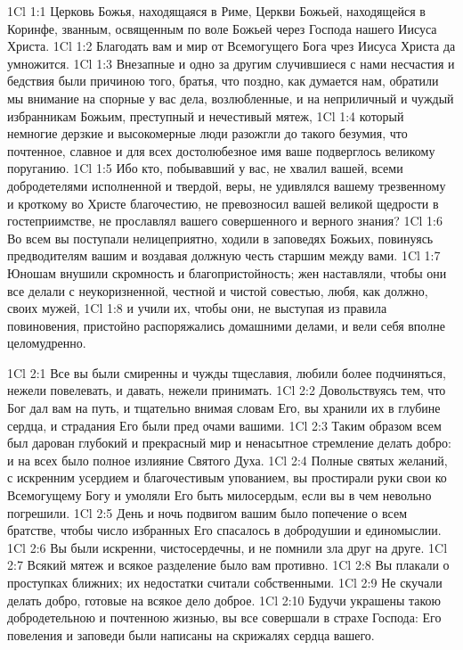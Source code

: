 \vs 1Cl 1:1
Церковь Божья,
находящаяся в Риме, Церкви Божьей, находящейся в Коринфе, званным, освященным
по воле Божьей через Господа нашего Иисуса Христа.
\vs 1Cl 1:2
Благодать вам и мир от
Всемогущего Бога чрез Иисуса Христа да умножится.
\vs 1Cl 1:3
Внезапные и одно за другим случившиеся с нами
несчастия и бедствия были причиною того, братья, что поздно, как думается нам,
обратили мы внимание на спорные у вас дела, возлюбленные, и на неприличный и
чуждый избранникам Божьим, преступный и нечестивый мятеж,
\vs 1Cl 1:4
который немногие дерзкие и высокомерные люди
разожгли до такого безумия, что почтенное, славное и для всех достолюбезное
имя ваше подверглось великому поруганию.
\vs 1Cl 1:5
Ибо кто, побывавший у вас, не хвалил вашей,
всеми добродетелями исполненной и твердой, веры, не удивлялся вашему
трезвенному и кроткому во Христе благочестию, не превозносил вашей великой
щедрости в гостеприимстве, не прославлял вашего совершенного и верного знания?
\vs 1Cl 1:6
Во всем вы поступали нелицеприятно, ходили в
заповедях Божьих, повинуясь предводителям вашим и воздавая должную честь
старшим между вами.
\vs 1Cl 1:7
Юношам внушили скромность и благопристойность;
жен наставляли, чтобы они все делали с неукоризненной, честной и чистой
совестью, любя, как должно, своих мужей,
\vs 1Cl 1:8
и учили их, чтобы они, не выступая из правила
повиновения, пристойно распоряжались домашними делами, и вели себя вполне
целомудренно.

\vs 1Cl 2:1
Все вы были смиренны и
чужды тщеславия, любили более подчиняться, нежели повелевать, и давать, нежели
принимать.
\vs 1Cl 2:2
Довольствуясь тем, что Бог
дал вам на путь, и тщательно внимая словам Его, вы хранили их в глубине
сердца, и страдания Его были пред очами вашими.
\vs 1Cl 2:3
Таким образом всем был
дарован глубокий и прекрасный мир и ненасытное стремление делать добро: и на
всех было полное излияние Святого Духа.
\vs 1Cl 2:4
Полные святых желаний, с
искренним усердием и благочестивым упованием, вы простирали руки свои ко
Всемогущему Богу и умоляли Его быть милосердым, если вы в чем невольно
погрешили.
\vs 1Cl 2:5
День и ночь подвигом вашим
было попечение о всем братстве, чтобы число избранных Его спасалось в
добродушии и единомыслии.
\vs 1Cl 2:6
Вы были искренни,
чистосердечны, и не помнили зла друг на друге.
\vs 1Cl 2:7
Всякий мятеж и всякое
разделение было вам противно.
\vs 1Cl 2:8
Вы плакали о проступках
ближних; их недостатки считали собственными.
\vs 1Cl 2:9
Не скучали делать добро,
готовые на всякое дело доброе.
\vs 1Cl 2:10
Будучи украшены такою
добродетельною и почтенною жизнью, вы все совершали в страхе Господа: Его
повеления и заповеди были написаны на скрижалях сердца вашего.

